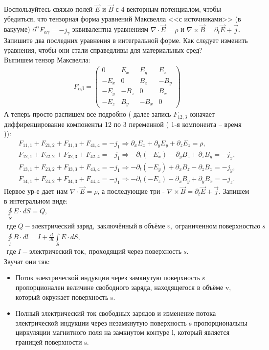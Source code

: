 \documentclass[__main__.tex]{subfiles}
\begin{document}
Воспользуйтесь связью полей $\vec{E}$ и $\vec{B}$ с 4-векторным потенциалом, чтобы убедиться, что тензорная форма уравнений Максвелла <<с источниками>> (в вакууме) $\partial^{\alpha}F_{\alpha\gamma}=-j_{\gamma}$ эквивалентна уравнениям $\nabla\cdot\vec{E}=\rho$ и $\nabla\times\vec{B}=\partial_{t}\vec{E}+\vec{j}$. Запишите два последних уравнения в интегральной форме. Как следует изменить уравнения, чтобы они стали справедливы для материальных сред?\\ 

Выпишем тензор Максвелла:
\begin{gather*}
F_{\alpha\beta}=
\begin{pmatrix}
0 & E_x & E_y & E_z\\
-E_x & 0 & B_z & -B_y\\
-E_y & -B_z & 0 & B_x\\
-E_z & B_y & -B_x & 0
\end{pmatrix}
\end{gather*}
А теперь просто распишем все подробно ( далее запись $F_{12,3}$ означает диффиренцирование компоненты 12 по 3 переменной ( 1-я компонента -- время )):
\begin{gather*}
	F_{11,1}+F_{21,2}+F_{31,3}+F_{41,4} = -j_1 \Rightarrow \partial_x E_x+\partial_y E_y+\partial_z E_z = \rho,\\
	F_{12,1}+F_{22,2}+F_{32,3}+F_{42,4} = -j_1 \Rightarrow -\partial_t(-E_x)-\partial_y B_z+\partial_z B_y = -j_x,\\
	F_{13,1}+F_{23,2}+F_{33,3}+F_{43,4} = -j_1 \Rightarrow -\partial_t(-E_y)+\partial_x B_z-\partial_z B_x = -j_y,\\
	F_{14,1}+F_{24,2}+F_{34,3}+F_{44,4} = -j_1 \Rightarrow -\partial_t(-E_z)-\partial_x B_y+\partial_y B_x = -j_z.
\end{gather*}
Первое ур-е дает нам $\nabla\cdot\vec E = \rho$, а последующие три - $\nabla\times\vec B = \partial_{t}\vec E + \vec j$. Запишем в интегральном виде:
\begin{gather*}
\oint\limits_S E\cdot dS = Q,\\ где\;Q - электрический\; заряд, \;заключённый \;в\; объёме \;v,\; ограниченном\; поверхностью \;s\\
\oint\limits_l B\cdot dl = I + \frac{d}{dt}\int\limits_S E\cdot dS,\\ где\; I -  электрический\; ток,\; проходящий\; через\; поверхность\; s.
\end{gather*}
Звучат они так:
\begin{itemize}
	\item Поток электрической индукции через замкнутую поверхность s пропорционален величине свободного заряда, находящегося в объёме v, который окружает поверхность s.
	\item Полный электрический ток свободных зарядов и изменение потока электрической индукции через незамкнутую поверхность s пропорциональны циркуляции магнитного поля на замкнутом контуре l, который является границей поверхности s.
\end{itemize}
\end{document}
